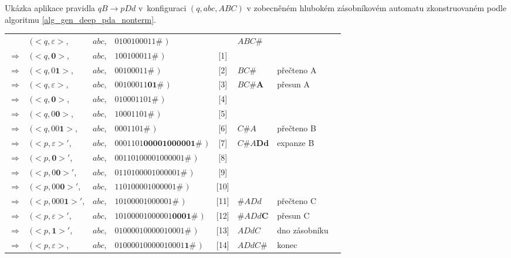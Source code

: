 \begin{Example}
\setlength{\tabcolsep}{\deftabcolsep}

\newpage
Ukázka aplikace pravidla $qB \rightarrow p Dd$ v~konfiguraci $(q, abc, ABC)$ v zobecněném hlubokém zásobníkovém automatu zkonstruovaném podle algoritmu \ref{alg_gen_deep_pda_nonterm}.

\begin{center}
\begin{tabular}{llllc|l|ll}
                & $( <q, \varepsilon>$,  & $abc$, & $0100100011\#$         $)$ && $ABC\#$ \\
$\Rightarrow$   & $( <q, \mathbf{0}>$,   & $abc$, & $100100011\#$         $)$ &[1]& \\
$\Rightarrow$   & $( <q, 0\mathbf{1}>$,  & $abc$, & $00100011\#$         $)$ &[2]&   $BC\#$ & přečteno A~\\
$\Rightarrow$   & $( <q, \varepsilon>$,  & $abc$, & $00100011\mathbf{01}\#$         $)$ &[3]& $BC\#\mathbf{A}$ & přesun A~\\
$\Rightarrow$   & $( <q, \mathbf{0}>$,   & $abc$, & $010001101\#$         $)$ &[4]& \\
$\Rightarrow$   & $( <q, 0\mathbf{0}>$,  & $abc$, & $10001101\#$         $)$ &[5]& \\
$\Rightarrow$   & $( <q, 00\mathbf{1}>$, & $abc$, & $0001101\#$         $)$ &[6]&    $C\#A$ & přečteno B \\
$\Rightarrow$   & $( <p,\varepsilon>'$,  & $abc$, & $0001101\mathbf{00001000001}\#$         $)$ &[7]& $C\#A\mathbf{Dd}$ & expanze B \\
$\Rightarrow$   & $( <p,\mathbf{0}>'$,   & $abc$, & $00110100001000001\#$         $)$ &[8]& \\
$\Rightarrow$   & $( <p,0\mathbf{0}>'$,  & $abc$, & $0110100001000001\#$         $)$ &[9]& \\
$\Rightarrow$   & $( <p,00\mathbf{0}>'$, & $abc$, & $110100001000001\#$         $)$ &[10]& \\
$\Rightarrow$   & $( <p,000\mathbf{1}>'$,& $abc$, & $10100001000001\#$         $)$ &[11]& $\#ADd$ & přečteno C  \\
$\Rightarrow$   & $( <p,\varepsilon>'$,  & $abc$, & $10100001000001\mathbf{0001}\#$         $)$ &[12]& $\#ADd\mathbf{C}$ & přesun C \\
$\Rightarrow$   & $( <p,\mathbf{1}>'$,   & $abc$, & $01000010000010001\#$         $)$ &[13]& $ADdC$ & dno zásobníku \\
$\Rightarrow$   & $( <p,\varepsilon>$,   & $abc$, & $01000010000010001\mathbf{1}\#$         $)$ &[14]& $ADdC\mathbf{\#}$ & konec


\end{tabular}
\end{center}


\end{Example}
